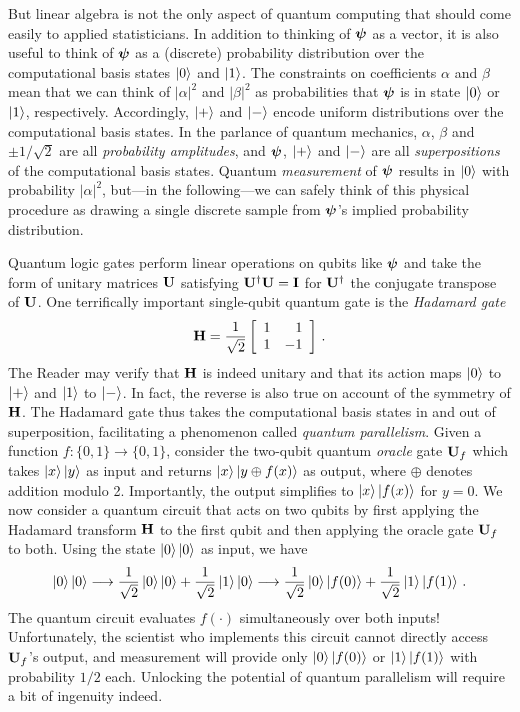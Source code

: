 \documentclass[12pt]{article} %
\begin{document}
But linear algebra is not the only aspect of quantum computing that should come easily to applied statisticians. In addition to thinking of $\boldsymbol{\psi}$ as a vector, it is also useful to think of $\boldsymbol{\psi}$ as a (discrete) probability distribution over the computational basis states $\ket{0}$ and $\ket{1}$. The constraints on coefficients $\alpha$ and $\beta$ mean that we can think of $|\alpha|^2$ and $|\beta|^2$ as probabilities that $\boldsymbol{\psi}$ is in state $\ket{0}$ or $\ket{1}$, respectively.  Accordingly, $\ket{+}$ and $\ket{-}$ encode uniform distributions over the computational basis states.  In the parlance of quantum mechanics, $\alpha$, $\beta$ and $\pm1/\sqrt{2}$ are all \emph{probability amplitudes}, and $\boldsymbol{\psi}$, $\ket{+}$ and $\ket{-}$ are all \emph{superpositions} of the computational basis states. Quantum \emph{measurement} of $\boldsymbol{\psi}$ results in $\ket{0}$ with probability $|\alpha|^2$, but---in the following---we can safely think of this physical procedure as drawing a single discrete sample from $\boldsymbol{\psi}$'s implied probability distribution.

Quantum logic gates perform linear operations on qubits like $\boldsymbol{\psi}$ and take the form of unitary matrices $\mathbf{U}$ satisfying $\mathbf{U}^\dagger \mathbf{U}=\mathbf{I}$ for $\mathbf{U}^\dagger$ the conjugate transpose of $\mathbf{U}$. One terrifically important single-qubit quantum gate is the \emph{Hadamard gate}
\begin{align}
\mathbf{H} = \frac{1}{\sqrt{2}} \left[\begin{array}{rr}
1 & 1 \\
1 & -1 \end{array}\right] \, .
\end{align}
The Reader may verify that $\mathbf{H}$ is indeed unitary and that its action maps $\ket{0}$ to $\ket{+}$ and $\ket{1}$ to $\ket{-}$.  In fact, the reverse is also true on account of the symmetry of $\mathbf{H}$.  The Hadamard gate thus takes the computational basis states in and out of superposition, facilitating a phenomenon called \emph{quantum parallelism}. Given a function $f: \{0,1\} \rightarrow \{0,1\}$, consider the two-qubit quantum \emph{oracle} gate $\mathbf{U}_f$ which takes $\ket{x}\ket{y}$ as input and returns $\ket{x}\ket{y\oplus f(x)}$ as output, where $\oplus$ denotes addition modulo 2.  Importantly, the output simplifies to $\ket{x}\ket{f(x)}$ for $y=0$. We now consider a quantum circuit that acts on two qubits by first applying the Hadamard transform $\mathbf{H}$ to the first qubit and then applying the oracle gate $\mathbf{U}_f$ to both. Using the state $\ket{0}\ket{0}$ as input, we have
\begin{align}\label{eq:quantparallel}
\ket{0}\ket{0} \longrightarrow \frac{1}{\sqrt{2}} \ket{0}\ket{0} + \frac{1}{\sqrt{2}} \ket{1}\ket{0}  \longrightarrow \frac{1}{\sqrt{2}} \ket{0}\ket{f(0)} + \frac{1}{\sqrt{2}} \ket{1}\ket{f(1)} \, .
\end{align}
The quantum circuit evaluates $f(\cdot)$ simultaneously over both inputs!  Unfortunately, the scientist who implements this circuit cannot directly access $\mathbf{U}_f$'s output, and measurement will provide only $\ket{0}\ket{f(0)}$ or $\ket{1}\ket{f(1)}$ with probability $1/2$ each.  Unlocking the potential of quantum parallelism will require a bit of ingenuity indeed.
\end{document}
